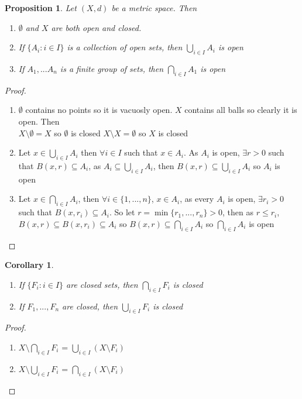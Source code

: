 \documentclass{article}
\newtheorem{corollary}{Corollary}[theorem]
\newtheorem{proposition}[theorem]{Proposition}
\begin{document}
\begin{proposition}
    Let $(X,d)$ be a metric space. Then
    \begin{enumerate}
        \item $\emptyset$ and $X$ are both open and closed.
        \item If $\{A_i : i \in I\}$ is a collection of open sets, then
            $\bigcup\limits_{i \in I} A_i$ is open
        \item If $A_1, ... A_n$ is a finite group of sets, then
            $\bigcap\limits_{i \in I} A_1$ is open
    \end{enumerate}
\end{proposition}
\begin{proof}
    \begin{enumerate}
        \item $\emptyset$ contains no points so it is vacuosly open. $X$ contains all
            balls so clearly it is open. Then \\
            $X \setminus \emptyset = X$ so $\emptyset$ is closed
            $X \setminus X = \emptyset$ so $X$ is closed
        \item Let $x \in \bigcup\limits_{i\in I} A_i$ then $\forall i \in I$ such that
            $x \in A_i$. As $A_i$ is open, $\exists r > 0$ such that
            $B(x,r) \subseteq A_i$, as $A_i \subseteq \bigcup\limits_{i\in I} A_i$, then
            $B(x,r) \subseteq \bigcup\limits_{i\in I} A_i$ so $A_i$ is open
        \item Let $x\in \bigcap\limits_{i\in I} A_i$, then $\forall i \in \{1, ..., n\}$,
            $x \in A_i$, as every $A_i$ is open, $\exists r_i > 0$ such that
            $B(x,r_i) \subseteq A_i$. So let $r = \min\{r_1, ... , r_n\} > 0$, then as
            $r \leq r_i$, $B(x,r) \subseteq B(x,r_i) \subseteq A_i$ so
            $B(x,r) \subseteq \bigcap\limits_{i\in I} A_i$ so
            $\bigcap\limits_{i\in I} A_i$ is open
    \end{enumerate}
\end{proof}

\begin{corollary}
    \begin{enumerate}
        \item If $\{F_i : i \in I\}$ are closed sets, then
            $\bigcap\limits_{i\in I} F_i$ is closed
        \item If $F_1, ..., F_n$ are closed, then
            $\bigcup\limits_{i\in I} F_i$ is closed
    \end{enumerate}
\end{corollary}
\begin{proof}
    \begin{enumerate}
        \item $X \setminus \bigcap\limits_{i\in I} F_i$ =
            $\bigcup\limits_{i\in I} (X\setminus F_i)$
        \item $X \setminus \bigcup\limits_{i\in I} F_i$ =
            $\bigcap\limits_{i\in I} (X\setminus F_i)$
    \end{enumerate}
\end{proof}
\end{document}
